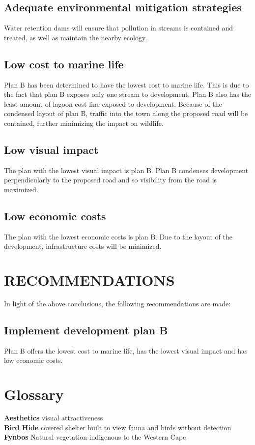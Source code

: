 \documentclass{article}
\begin{document}
\subsection{Adequate environmental mitigation strategies}
Water retention dams will ensure that pollution in streams is contained and treated, as well as maintain the nearby ecology.

\subsection{Low cost to marine life}
Plan B has been determined to have the lowest cost to marine life. This is due to the fact that plan B exposes only one stream to development. Plan B also has the least amount of lagoon cost line exposed to development. Because of the condensed layout of plan B, traffic into the town along the proposed road will be contained, further minimizing the impact on wildlife.

\subsection{Low visual impact}
The plan with the lowest visual impact is plan B. Plan B condenses development perpendicularly to the proposed road and so visibility from the road is maximized.

\subsection{Low economic costs}
The plan with the lowest economic costs is plan B. Due to the layout of the development, infrastructure costs will be minimized.

\newpage
\section{RECOMMENDATIONS}
In light of the above conclusions, the following recommendations are made:

\subsection{Implement development plan B}
Plan B offers the lowest cost to marine life, has the lowest visual impact and has low economic costs.

\newpage
\listoffigures

\newpage
\section*{Glossary}
\textbf{Aesthetics} \quad visual attractiveness\\
\textbf{Bird Hide} \quad covered shelter built to view fauna and birds without detection\\
\textbf{Fynbos} \quad Natural vegetation indigenous to the Western Cape

\newpage
\printbibliography
\end{document}
